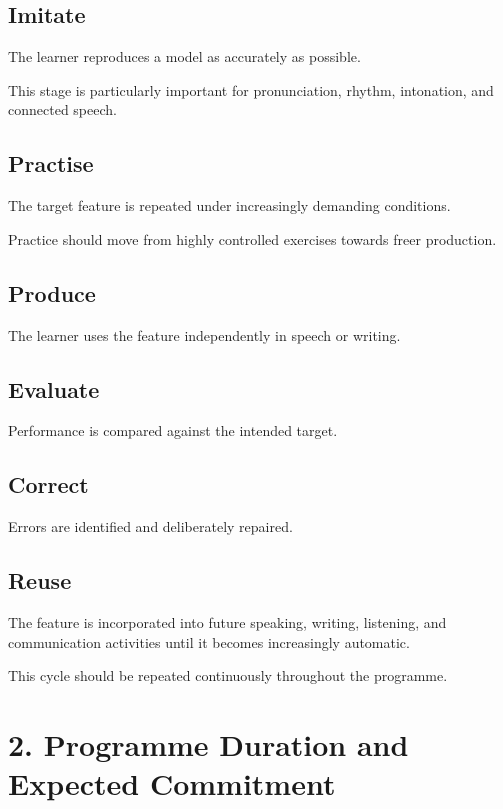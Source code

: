 \subsection*{Imitate}

The learner reproduces a model as accurately as possible.

This stage is particularly important for pronunciation, rhythm, intonation, and connected speech.

\subsection*{Practise}

The target feature is repeated under increasingly demanding conditions.

Practice should move from highly controlled exercises towards freer production.

\subsection*{Produce}

The learner uses the feature independently in speech or writing.

\subsection*{Evaluate}

Performance is compared against the intended target.

\subsection*{Correct}

Errors are identified and deliberately repaired.

\subsection*{Reuse}

The feature is incorporated into future speaking, writing, listening, and communication activities until it becomes increasingly automatic.

This cycle should be repeated continuously throughout the programme.

\section*{2. Programme Duration and Expected Commitment}

